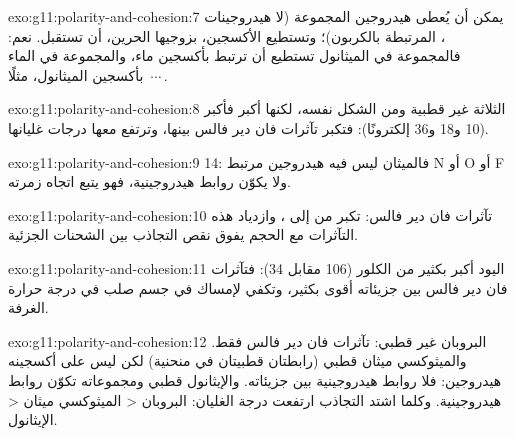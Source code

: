 \begin{solution}{exo:g11:polarity-and-cohesion:7}
يمكن أن يُعطى هيدروجين المجموعة  (لا هيدروجينات
، المرتبطة بالكربون)؛ وتستطيع  الأكسجين، بزوجيها الحرين، أن
تستقبل. نعم: فالمجموعة  في الميثانول تستطيع أن ترتبط بأكسجين 
ماء، والمجموعة  في الماء بأكسجين الميثانول، مثلًا
\,$\cdots$\,.
\end{solution}

\begin{solution}{exo:g11:polarity-and-cohesion:8}
 الثلاثة غير قطبية ومن الشكل نفسه، لكنها أكبر
فأكبر (10 و18 و36 إلكترونًا): فتكبر تآثرات فان دير فالس بينها،
وترتفع معها درجات غليانها.
\end{solution}

\begin{solution}{exo:g11:polarity-and-cohesion:9}
 14: فالميثان ليس فيه هيدروجين مرتبط  N أو O أو F ولا يكوّن روابط
هيدروجينية، فهو يتبع اتجاه زمرته.
\end{solution}

\begin{solution}{exo:g11:polarity-and-cohesion:10}
تآثرات فان دير فالس:  تكبر من  إلى
، وازدياد هذه التآثرات مع الحجم يفوق نقص التجاذب بين الشحنات
الجزئية.
\end{solution}

\begin{solution}{exo:g11:polarity-and-cohesion:11}
 اليود أكبر بكثير من  الكلور (106
 مقابل 34): فتآثرات فان دير فالس بين جزيئاته أقوى بكثير، وتكفي
لإمساك  في جسم صلب في درجة حرارة الغرفة.
\end{solution}

\begin{solution}{exo:g11:polarity-and-cohesion:12}
البروبان غير قطبي: تآثرات فان دير فالس فقط. والميثوكسي ميثان
قطبي (رابطتان  قطبيتان في  منحنية) لكن ليس على أكسجينه
هيدروجين: فلا روابط هيدروجينية بين جزيئاته. والإيثانول
قطبي ومجموعاته  تكوّن روابط هيدروجينية. وكلما اشتد
التجاذب ارتفعت درجة الغليان: البروبان < الميثوكسي ميثان
< الإيثانول.
\end{solution}

